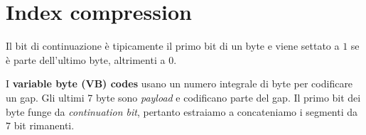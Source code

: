 \documentclass[\main/main.tex]{subfiles}
\begin{document}
\chapter{Index compression}
\begin{multicols}{2}
\begin{definition}
    Il bit di continuazione è tipicamente il primo bit di un byte e viene settato a \(1\) se è parte dell'ultimo byte, altrimenti a \(0\).
\end{definition}
\begin{definition}
    I \textbf{variable byte (VB) codes} usano un numero integrale di byte per codificare un gap. Gli ultimi 7 byte sono \textit{payload} e codificano parte del gap. Il primo bit dei byte funge da \textit{continuation bit}, pertanto estraiamo a concateniamo i segmenti da \(7\) bit rimanenti.
\end{definition}
\end{multicols}
\end{document}
